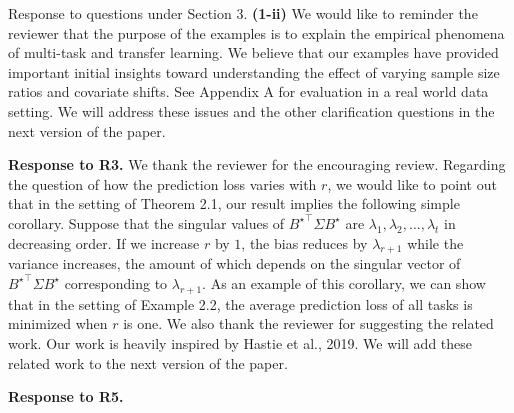 \documentclass{article}
\begin{document}
	Response to questions under Section 3.
	\textbf{(1-ii)} We would like to reminder the reviewer that the purpose of the examples is to explain the empirical phenomena of multi-task and transfer learning.
	We believe that our examples have provided important initial insights toward understanding the effect of varying sample size ratios and covariate shifts.
	See Appendix A for evaluation in a real world data setting.
	We will address these issues and the other clarification questions in the next version of the paper.

	\textbf{Response to R3.}
	We thank the reviewer for the encouraging review.
	Regarding the question of how the prediction loss varies with $r$, we would like to point out that in the setting of Theorem 2.1, our result implies the following simple corollary.
	Suppose that the singular values of ${B^{\star}}^{\top}\Sigma B^{\star}$ are $\lambda_1, \lambda_2, \dots, \lambda_t$ in decreasing order.
	If we increase $r$ by $1$, the bias reduces by $\lambda_{r+1}$ while the variance increases, the amount of which depends on the singular vector of  ${B^{\star}}^{\top}\Sigma B^{\star}$ corresponding to $\lambda_{r+1}$.
	As an example of this corollary, we can show that in the setting of Example 2.2, the average prediction loss of all tasks is minimized when $r$ is one.
	We also thank the reviewer for suggesting the related work.
	Our work is heavily inspired by Hastie et al., 2019.
	We will add these related work to the next version of the paper.

	\textbf{Response to R5.}
\end{document}
